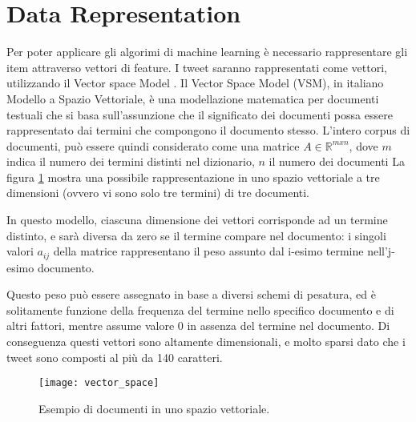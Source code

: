 \section{Data Representation} 
Per poter applicare gli algorimi di machine learning è necessario rappresentare gli item attraverso vettori di feature.
I tweet saranno rappresentati come vettori, utilizzando il Vector space Model \cite{Salton:1989:ATP:77013}. 
Il Vector Space Model (VSM), in italiano Modello a Spazio Vettoriale, è una modellazione matematica per documenti testuali che si basa sull'assunzione che il significato dei documenti possa essere rappresentato dai termini che compongono il documento stesso. 
L'intero corpus di documenti, può essere quindi considerato come una matrice $A \in \mathbb{R}^{mxn}$, dove $m$  indica il numero dei termini distinti nel dizionario, $n$  il numero dei documenti 
La figura \ref{fig:vsm}  mostra una possibile rappresentazione in uno spazio vettoriale a tre dimensioni (ovvero vi sono solo tre termini) di tre documenti.

In questo modello, ciascuna dimensione dei vettori corrisponde ad un termine distinto, e sarà diversa da zero se il termine compare nel documento: i singoli valori $a_{ij}$ della matrice rappresentano il peso
assunto dal i-esimo termine nell’j-esimo documento.

 Questo peso può essere assegnato in base a  diversi schemi di pesatura, ed è solitamente funzione della frequenza del termine nello specifico documento e di altri fattori, mentre assume valore 0 in assenza del
termine nel documento. Di conseguenza questi vettori sono altamente dimensionali, e molto sparsi dato che i tweet sono composti al più da 140 caratteri. 

\begin{figure}[h]
    \centering
    \texttt{[image: vector\_space]}
    \caption{Esempio di documenti in uno spazio vettoriale.}
    \label{fig:vsm}
\end{figure}  


